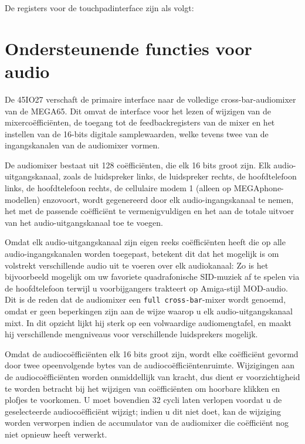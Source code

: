 De registers voor de touchpadinterface zijn als volgt:



\section{Ondersteunende functies voor audio}
De 45IO27 verschaft de primaire interface naar de volledige cross-bar-audiomixer van de MEGA65. Dit omvat de interface voor het lezen of wijzigen van de mixercoëfficiënten, de toegang tot de feedbackregisters van de mixer en het instellen van de 16-bits digitale samplewaarden, welke tevens twee van de ingangskanalen van de audiomixer vormen.

De audiomixer bestaat uit 128 coëfficiënten, die elk 16 bits groot zijn. Elk audio-uitgangskanaal, zoals de luidspreker links, de luidspreker rechts, de hoofdtelefoon links, de hoofdtelefoon rechts, de cellulaire modem 1 (alleen op MEGAphone-modellen) enzovoort, wordt gegenereerd door elk audio-ingangskanaal te nemen, het met de passende coëfficiënt te vermenigvuldigen en het aan de totale uitvoer van het audio-uitgangskanaal toe te voegen.

Omdat elk audio-uitgangskanaal zijn eigen reeks coëfficiënten heeft die op alle audio-ingangskanalen worden toegepast, betekent dit dat het mogelijk is om volstrekt verschillende audio uit te voeren over elk audiokanaal: Zo is het bijvoorbeeld mogelijk om uw favoriete quadrafonische SID-muziek af te spelen via de hoofdtelefoon terwijl u voorbijgangers trakteert op Amiga-stijl MOD-audio. Dit is de reden dat de audiomixer een {\tt full  cross-bar}-mixer wordt genoemd, omdat er geen beperkingen zijn aan de wijze waarop u elk audio-uitgangskanaal mixt. In dit opzicht lijkt hij sterk op een volwaardige audiomengtafel, en maakt hij verschillende mengniveaus voor verschillende luidsprekers mogelijk.

Omdat de audiocoëfficiënten elk 16 bits groot zijn, wordt elke coëfficiënt gevormd door twee opeenvolgende bytes van de audiocoëfficiëntenruimte. Wijzigingen aan de audiocoëfficiënten worden onmiddellijk van kracht, dus dient er voorzichtigheid te worden betracht bij het wijzigen van coëfficiënten om hoorbare klikken en plofjes te voorkomen. U moet bovendien 32 cycli laten verlopen voordat u de geselecteerde audiocoëfficiënt wijzigt; indien u dit niet doet, kan de wijziging worden verworpen indien de accumulator van de audiomixer die coëfficiënt nog niet opnieuw heeft verwerkt.

